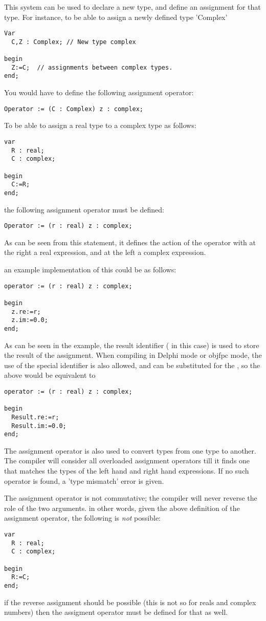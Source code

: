 \documentclass{report}
\begin{document}
This system can be used to declare a new type, and define an assignment for
that type. For instance, to be able to assign a newly defined type 'Complex'
\begin{verbatim}
Var 
  C,Z : Complex; // New type complex

begin
  Z:=C;  // assignments between complex types.
end;
\end{verbatim}
You would have to define the following assignment operator: 
\begin{verbatim}
Operator := (C : Complex) z : complex;
\end{verbatim}


To be able to assign a real type to a complex type as follows:
\begin{verbatim}
var 
  R : real;
  C : complex;

begin
  C:=R;
end;
\end{verbatim}
the following assignment operator must be defined: 
\begin{verbatim}
Operator := (r : real) z : complex;
\end{verbatim}
As can be seen from this statement, it defines the action of the operator
\var{:=} with at the right a real expression, and at the left a complex
expression. 

an example implementation of this could be as follows:
\begin{verbatim}
operator := (r : real) z : complex;
    
begin
  z.re:=r;
  z.im:=0.0;
end;
\end{verbatim}
As can be seen in the example, the result identifier ( in this case)
is used to store the result of the assignment. When compiling in Delphi mode
or objfpc mode, the use of the special identifier  is also
allowed, and can be substituted for the , so the above would be
equivalent to
\begin{verbatim}
operator := (r : real) z : complex;
    
begin
  Result.re:=r;
  Result.im:=0.0;
end;
\end{verbatim}

The assignment operator is also used to convert types from one type to
another. The compiler will consider all overloaded assignment operators
till it finds one that matches the types of the left hand and right hand
expressions. If no such operator is found, a 'type mismatch' error
is given.

\begin{remark}
The assignment operator is not commutative; the compiler will never reverse
the role of the two arguments. in other words, given the above definition of
the assignment operator, the following is {\em not} possible:
\begin{verbatim}
var 
  R : real;
  C : complex;

begin
  R:=C;
end;
\end{verbatim}
if the reverse assignment should be possible (this is not so for reals and
complex numbers) then the assigment operator must be defined for that as well.
\end{remark}
\end{document}
